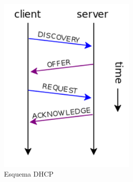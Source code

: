 \documentclass[a4paper,11pt]{article}
\begin{document}
\begin{figure}[h]
\centering
\caption{Esquema DHCP}
\includegraphics[scale=1,width=0.6\textwidth]{esquema_dhcp.png}
\end{figure}
\end{document}
